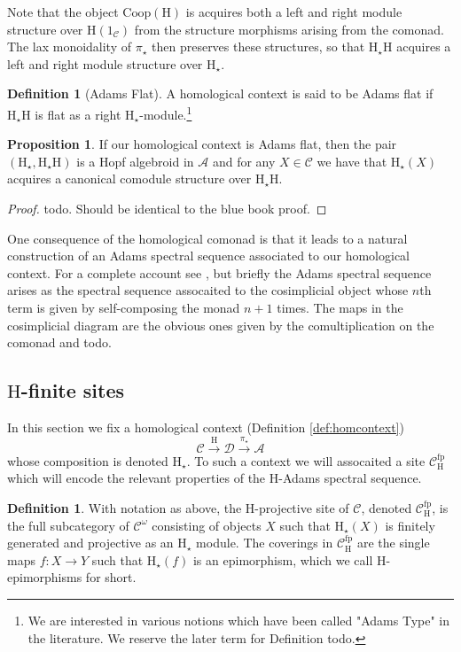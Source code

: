 \documentclass[10pt]{amsart}
\theoremstyle{definition}
\numberwithin{figure}{section}
\numberwithin{equation}{section}
\newtheorem{proposition}[figure]{Proposition}
\newtheorem{definition}[figure]{Definition}
\newcommand{\cA}{\mathcal{A}}
\newcommand{\cC}{\mathcal{C}}
\newcommand{\cD}{\mathcal{D}}
\newcommand{\one}{\mathrm{1}}
\theoremstyle{cited}
\newcommand{\fp}{\mathrm{fp}}
\renewcommand{\H}{\mathrm{H}}
\newcommand{\Coop}{\mathrm{Coop}}
\begin{document}
Note that the object $\Coop(\H)$ is acquires both a left and right module structure over $\H(\one_{\cC})$ from the structure morphisms arising from the comonad. The lax monoidality of $\pi_\star$ then preserves these structures, so that $\H_\star \H$ acquires a left and right module structure over $\H_\star$.

\begin{definition}[Adams Flat]
  A homological context is said to be Adams flat if $\H_\star \H$ is flat as a right $\H_\star$-module.\footnote{We are interested in various notions which have been called "Adams Type" in the literature. We reserve the later term for Definition {todo}.}
\end{definition}

\begin{proposition}
  If our homological context is Adams flat, then the pair $(\H_\star, \H_\star\H)$ is a Hopf algebroid in $\cA$ and for any $X\in \cC$ we have that $\H_\star(X)$ acquires a canonical comodule structure over $\H_\star \H$.
\end{proposition}

\begin{proof}
  todo. Should be identical to the blue book proof.
\end{proof}

One consequence of the homological comonad is that it leads to a natural construction of an Adams spectral sequence associated to our homological context. For a complete account see \cite{todo}, but briefly the Adams spectral sequence arises as the spectral sequence assocaited to the cosimplicial object whose $n$th term is given by self-composing the monad $n+1$ times. The maps in the cosimplicial diagram are the obvious ones given by the comultiplication on the comonad and todo.

\subsection{$\H$-finite sites}

In this section we fix a homological context (Definition \ref{def:homcontext})
\[
\cC\xrightarrow{\H} \cD \xrightarrow{\pi_\star} \cA
\]
whose composition is denoted $\H_\star$. To such a context we will assocaited a site $\cC_{\H}^\fp$ which will encode the relevant properties of the $\H$-Adams spectral sequence.

\begin{definition}\label{def:projectivesite}
  With notation as above, the $\H$-projective site of $\cC$, denoted $\cC^{\fp}_{\H}$, is the full subcategory of $\cC^\omega$ consisting of objects $X$ such that $\H_{\star}(X)$ is finitely generated and projective as an $\H_\star$ module. The coverings in $\cC^\fp_{\H}$ are the single maps $f:X\to Y$ such that $\H_\star(f)$ is an epimorphism, which we call $\H$-epimorphisms for short.
\end{definition}
\end{document}
